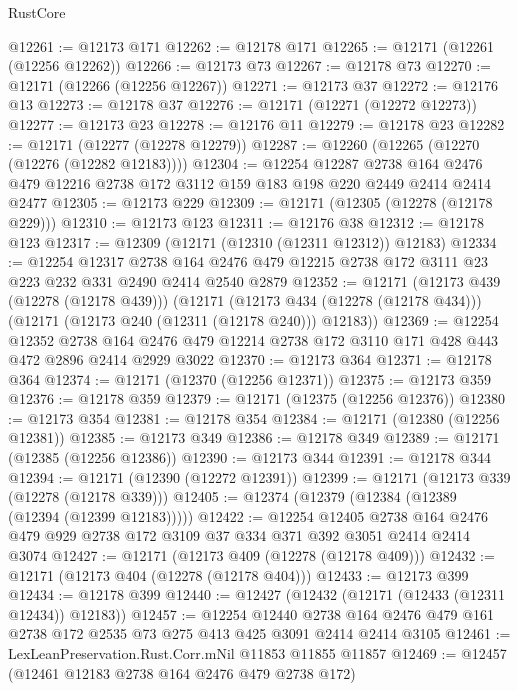 \begin{lexlean}{RustCore}
\begin{coremodule}
@12261 := @12173 @171
@12262 := @12178 @171
@12265 := @12171 (@12261 (@12256 @12262))
@12266 := @12173 @73
@12267 := @12178 @73
@12270 := @12171 (@12266 (@12256 @12267))
@12271 := @12173 @37
@12272 := @12176 @13
@12273 := @12178 @37
@12276 := @12171 (@12271 (@12272 @12273))
@12277 := @12173 @23
@12278 := @12176 @11
@12279 := @12178 @23
@12282 := @12171 (@12277 (@12278 @12279))
@12287 := @12260 (@12265 (@12270 (@12276 (@12282 @12183))))
@12304 := @12254
    @12287
    @2738
    @164
    @2476
    @479
    @12216
    @2738
    @172
    @3112
    @159
    @183
    @198
    @220
    @2449
    @2414
    @2414
    @2477
@12305 := @12173 @229
@12309 := @12171 (@12305 (@12278 (@12178 @229)))
@12310 := @12173 @123
@12311 := @12176 @38
@12312 := @12178 @123
@12317 := @12309 (@12171 (@12310 (@12311 @12312)) @12183)
@12334 := @12254
    @12317
    @2738
    @164
    @2476
    @479
    @12215
    @2738
    @172
    @3111
    @23
    @223
    @232
    @331
    @2490
    @2414
    @2540
    @2879
@12352 := @12171
    (@12173 @439 (@12278 (@12178 @439)))
    (@12171
      (@12173 @434 (@12278 (@12178 @434)))
      (@12171 (@12173 @240 (@12311 (@12178 @240))) @12183))
@12369 := @12254
    @12352
    @2738
    @164
    @2476
    @479
    @12214
    @2738
    @172
    @3110
    @171
    @428
    @443
    @472
    @2896
    @2414
    @2929
    @3022
@12370 := @12173 @364
@12371 := @12178 @364
@12374 := @12171 (@12370 (@12256 @12371))
@12375 := @12173 @359
@12376 := @12178 @359
@12379 := @12171 (@12375 (@12256 @12376))
@12380 := @12173 @354
@12381 := @12178 @354
@12384 := @12171 (@12380 (@12256 @12381))
@12385 := @12173 @349
@12386 := @12178 @349
@12389 := @12171 (@12385 (@12256 @12386))
@12390 := @12173 @344
@12391 := @12178 @344
@12394 := @12171 (@12390 (@12272 @12391))
@12399 := @12171 (@12173 @339 (@12278 (@12178 @339)))
@12405 := @12374 (@12379 (@12384 (@12389 (@12394 (@12399 @12183)))))
@12422 := @12254
    @12405
    @2738
    @164
    @2476
    @479
    @929
    @2738
    @172
    @3109
    @37
    @334
    @371
    @392
    @3051
    @2414
    @2414
    @3074
@12427 := @12171 (@12173 @409 (@12278 (@12178 @409)))
@12432 := @12171 (@12173 @404 (@12278 (@12178 @404)))
@12433 := @12173 @399
@12434 := @12178 @399
@12440 := @12427 (@12432 (@12171 (@12433 (@12311 @12434)) @12183))
@12457 := @12254
    @12440
    @2738
    @164
    @2476
    @479
    @161
    @2738
    @172
    @2535
    @73
    @275
    @413
    @425
    @3091
    @2414
    @2414
    @3105
@12461 := LexLeanPreservation.Rust.Corr.mNil @11853 @11855 @11857
@12469 := @12457 (@12461 @12183 @2738 @164 @2476 @479 @2738 @172)

\end{coremodule}
\end{lexlean}
